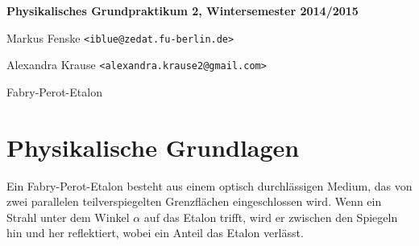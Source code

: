 \documentclass[a4paper,german,12pt,smallheadings]{scrartcl}
\begin{document}
\begin{titlepage}

\end{titlepage}

\allowdisplaybreaks %
\begin{center}
\bfseries %
\sffamily %
\vspace{-40pt}
Physikalisches Grundpraktikum 2, Wintersemester 2014/2015

Markus Fenske \texttt{<iblue@zedat.fu-berlin.de>}

Alexandra Krause \texttt{<alexandra.krause2@gmail.com>}

Fabry-Perot-Etalon
\vspace{-10pt}
\end{center}

\section{Physikalische Grundlagen}

Ein Fabry-Perot-Etalon besteht aus einem optisch durchlässigen Medium, das von
zwei parallelen teilverspiegelten Grenzflächen eingeschlossen wird. Wenn ein
Strahl unter dem Winkel $\alpha$ auf das Etalon trifft, wird er zwischen den
Spiegeln hin und her reflektiert, wobei ein Anteil das Etalon verlässt.
\end{document}
